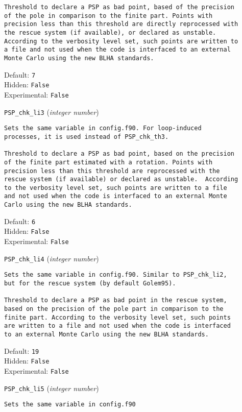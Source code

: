 \begin{basedescript}{\desclabelstyle{\pushlabel}}
\begin{verbatim}
Threshold to declare a PSP as bad point, based of the precision
of the pole in comparison to the finite part. Points with
precision less than this threshold are directly reprocessed with
the rescue system (if available), or declared as unstable.
According to the verbosity level set, such points are written to
a file and not used when the code is interfaced to an external
Monte Carlo using the new BLHA standards.
\end{verbatim}
Default: \verb|7|
\\Hidden: \verb|False|
\\Experimental: \verb|False|
\\\item[\colorbox{gray!30}{\texttt{PSP\_chk\_li3}}] (\textit{integer number})
\begin{verbatim}
Sets the same variable in config.f90. For loop-induced
processes, it is used instead of PSP_chk_th3.

Threshold to declare a PSP as bad point, based on the precision
of the finite part estimated with a rotation. Points with
precision less than this threshold are reprocessed with the
rescue system (if available) or declared as unstable.  According
to the verbosity level set, such points are written to a file
and not used when the code is interfaced to an external Monte
Carlo using the new BLHA standards.
\end{verbatim}
Default: \verb|6|
\\Hidden: \verb|False|
\\Experimental: \verb|False|
\\\item[\colorbox{gray!30}{\texttt{PSP\_chk\_li4}}] (\textit{integer number})
\begin{verbatim}
Sets the same variable in config.f90. Similar to PSP_chk_li2,
but for the rescue system (by default Golem95).

Threshold to declare a PSP as bad point in the rescue system,
based on the precision of the pole part in comparison to the
finite part. According to the verbosity level set, such points
are written to a file and not used when the code is interfaced
to an external Monte Carlo using the new BLHA standards.
\end{verbatim}
Default: \verb|19|
\\Hidden: \verb|False|
\\Experimental: \verb|False|
\\\item[\colorbox{gray!30}{\texttt{PSP\_chk\_li5}}] (\textit{integer number})
\begin{verbatim}
Sets the same variable in config.f90


\end{verbatim}
\end{basedescript}
